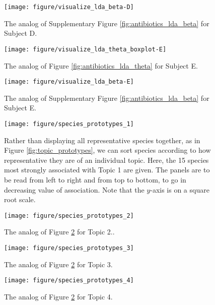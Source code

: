 \documentclass[oupdraft]{bio}
\begin{document}
\begin{figure}[!p]
  \centering\texttt{[image: figure/visualize\_lda\_beta-D]}
  \caption{The analog of Supplementary Figure \ref{fig:antibiotics_lda_beta} for
    Subject D.}
\end{figure}

\begin{figure}[!p]
  \centering\texttt{[image: figure/visualize\_lda\_theta\_boxplot-E]}
  \caption{The analog of Figure \ref{fig:antibiotics_lda_theta} for Subject E.}
\end{figure}

\begin{figure}[!p]
  \centering\texttt{[image: figure/visualize\_lda\_beta-E]}
  \caption{The analog of Supplementary Figure \ref{fig:antibiotics_lda_beta} for
    Subject E. \label{fig:antibiotics_lda_beta_E}}
\end{figure}

\begin{figure}[!p]
  \centering
  \texttt{[image: figure/species\_prototypes\_1]}
  \caption{Rather than displaying all representative species together, as in
    Figure \ref{fig:topic_prototypes}, we can sort species according to how
    representative they are of an individual topic. Here, the 15 species most
    strongly associated with Topic 1 are given. The panels are to be read from
    left to right and from top to bottom, to go in decreasing value of
    association. Note that the $y$-axis is on a square root
    scale. \label{fig:species_prototypes_1} }
\end{figure}

\begin{figure}[!p]
  \centering
  \texttt{[image: figure/species\_prototypes\_2]}
  \caption{The analog of Figure \ref{fig:species_prototypes_1} for Topic
    2.\label{fig:species_prototypes_2}. }
\end{figure}

\begin{figure}[!p]
  \centering
  \texttt{[image: figure/species\_prototypes\_3]}
  \caption{The analog of Figure \ref{fig:species_prototypes_1} for Topic
    3. \label{fig:species_prototypes_3} }
\end{figure}

\begin{figure}[!p]
  \centering
  \texttt{[image: figure/species\_prototypes\_4]}
  \caption{The analog of Figure \ref{fig:species_prototypes_1} for Topic
    4. \label{fig:species_prototypes_4} }
\end{figure}
\end{document}
